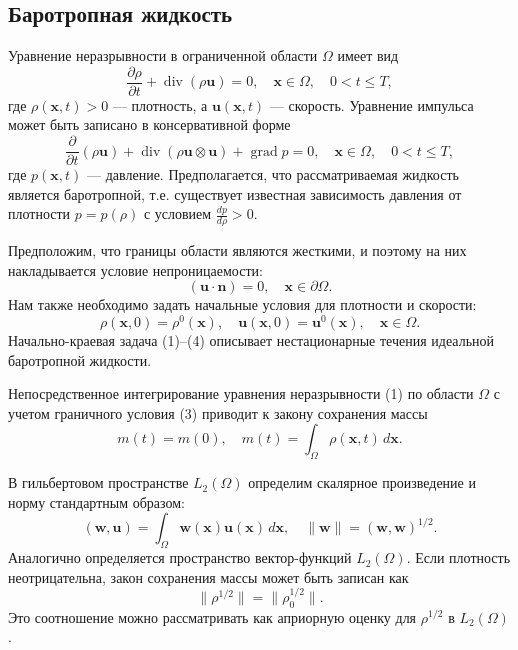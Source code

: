 \documentclass[10pt,twocolumn]{article}
\begin{document}
\subsection{Баротропная жидкость}

Уравнение неразрывности в ограниченной области \(\Omega\) имеет вид
\begin{equation}
\frac{\partial\rho}{\partial t} +\operatorname{div}(\rho \mathbf{u}) = 0,\quad \mathbf{x}\in \Omega ,\quad 0< t\leq T, \tag{1}
\end{equation}
где \(\rho (\mathbf{x},t) > 0\) — плотность, а \(\mathbf{u}(\mathbf{x},t)\) — скорость. Уравнение импульса может быть записано в консервативной форме
\begin{equation}
\frac{\partial}{\partial t} (\rho \mathbf{u}) + \operatorname{div}(\rho \mathbf{u}\otimes \mathbf{u}) + \operatorname{grad}p = 0,\quad \mathbf{x}\in \Omega ,\quad 0< t\leq T, \tag{2}
\end{equation}
где \(p(\mathbf{x},t)\) — давление. Предполагается, что рассматриваемая жидкость является баротропной, т.е. существует известная зависимость давления от плотности \(p = p(\rho)\) с условием \(\frac{dp}{d\rho} >0\).

Предположим, что границы области являются жесткими, и поэтому на них накладывается условие непроницаемости:
\begin{equation}
(\mathbf{u}\cdot \mathbf{n}) = 0,\quad \mathbf{x}\in \partial \Omega . \tag{3}
\end{equation}
Нам также необходимо задать начальные условия для плотности и скорости:
\begin{equation}
\rho (\mathbf{x},0) = \rho^0 (\mathbf{x}),\quad \mathbf{u}(\mathbf{x},0) = \mathbf{u}^0 (\mathbf{x}),\quad \mathbf{x}\in \Omega . \tag{4}
\end{equation}
Начально-краевая задача (1)--(4) описывает нестационарные течения идеальной баротропной жидкости.

Непосредственное интегрирование уравнения неразрывности (1) по области \(\Omega\) с учетом граничного условия (3) приводит к закону сохранения массы
\begin{equation}
m(t) = m(0),\quad m(t) = \int_{\Omega}\rho (\mathbf{x},t)\,d\mathbf{x}. \tag{5}
\end{equation}

В гильбертовом пространстве \(L_{2}(\Omega)\) определим скалярное произведение и норму стандартным образом:
\[
(\mathbf{w},\mathbf{u}) = \int_{\Omega}\mathbf{w}(\mathbf{x})\mathbf{u}(\mathbf{x})\,d\mathbf{x},\quad \| \mathbf{w}\| = (\mathbf{w},\mathbf{w})^{1 / 2}.
\]
Аналогично определяется пространство вектор-функций \(L_{2}(\Omega)\). Если плотность неотрицательна, закон сохранения массы может быть записан как
\[
\| \rho^{1 / 2}\| = \| \rho_{0}^{1 / 2}\|.
\]
Это соотношение можно рассматривать как априорную оценку для \(\rho^{1/2}\) в \(L_{2}(\Omega)\).
\end{document}
